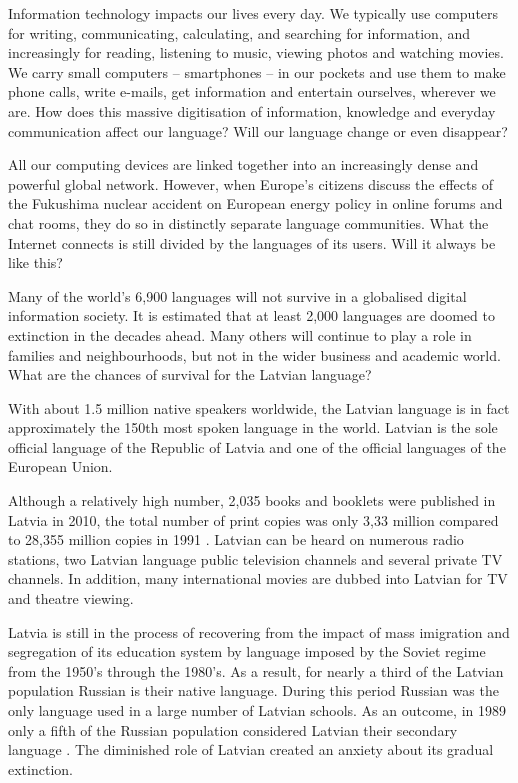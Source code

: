 \begin{multicols}{2}

Information technology impacts our lives every day.
We typically use computers for writing, communicating, calculating, and searching for information, and increasingly for reading, listening to music, viewing photos and watching movies.
We carry small computers – smartphones – in our pockets and use them to make phone calls, write e-mails, get information and entertain ourselves, wherever we are.
How does this massive digitisation of information, knowledge and everyday communication affect our language?
Will our language change or even disappear? 

All our computing devices are linked together into an increasingly dense and powerful global network.
However, when Europe's citizens discuss the effects of the Fukushima nuclear accident on European energy policy in online forums and chat rooms, they do so in distinctly separate language communities.
What the Internet connects is still divided by the languages of its users.
Will it always be like this? 

Many of the world’s 6,900 languages will not survive in a globalised digital information society.
It is estimated that at least 2,000 languages are doomed to extinction in the decades ahead.
Many others will continue to play a role in families and neighbourhoods, but not in the wider business and academic world.
What are the chances of survival for the Latvian language? 

With about 1.5 million native speakers worldwide, the Latvian language is in fact approximately the 150th most spoken language in the world.
Latvian is the sole official language of the Republic of Latvia and one of the official languages of the European Union.
  
Although a relatively high number, 2,035 books and booklets were published in Latvia in 2010, the total number of print copies was only 3,33 million compared to 28,355 million copies in 1991 \cite{Meta1ES}.
Latvian can be heard on numerous radio stations, two Latvian language public television channels and several private TV channels.
In addition, many international movies are dubbed into Latvian for TV and theatre viewing. 

Latvia is still in the process of recovering from the impact of mass imigration and segregation of its education system by language imposed by the Soviet regime from the 1950’s through the 1980’s.
As a result, for nearly a third of the Latvian population Russian is their native language.
During this period Russian was the only language used in a large number of Latvian schools.
As an outcome, in 1989 only a fifth of the Russian population considered Latvian their secondary language \cite{Meta2ES}.
The diminished role of Latvian created an anxiety about its gradual extinction.


\end{multicols}
